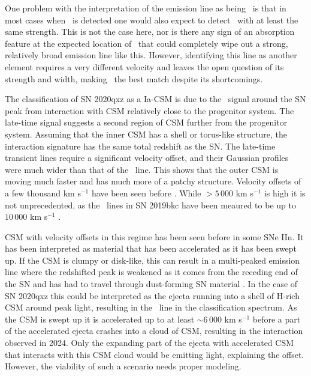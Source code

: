 \documentclass[a4paper,oneside,12pt, class=Latex/Classes/PhDthesisPSnPDF, crop=false]{standalone}
\begin{document}
One problem with the interpretation of the emission line as being \Hbeta\ is that in most cases when \Hbeta\ is detected one would also expect to detect \Halpha\ with at least the same strength. This is not the case here, nor is there any sign of an absorption feature at the expected location of \Halpha\ that could completely wipe out a strong, relatively broad emission line like this. However, identifying this line as another element requires a very different velocity and leaves the open question of its strength and width, making \Hbeta\ the best match despite its shortcomings.

The classification of SN 2020qxz as a Ia-CSM is due to the \Halpha\ signal around the SN peak from interaction with CSM relatively close to the progenitor system. The late-time signal suggests a second region of CSM further from the progenitor system. Assuming that the inner CSM has a shell or torus-like structure, the interaction signature has the same total redshift as the SN. The late-time transient lines require a significant velocity offset, and their Gaussian profiles were much wider than that of the \Halpha\ line. This shows that the outer CSM is moving much faster and has much more of a patchy structure. Velocity offsets of a few thousand km s$^{-1}$ have been seen before \citep{Maeda_exp_asymetry, Maguire_opt_NIR}. While $>5\,000$ km s$^{-1}$ is high it is not unprecedented, as the \CaII\ lines in SN 2019bkc have been meaured to be up to $10\,000$ km s$^{-1}$ \citep{2019bkc_Chen, 2019bkc_Prentice}.

CSM with velocity offsets in this regime has been seen before in some SNe IIn. It has been interpreted as material that has been accelerated as it has been swept up. If the CSM is clumpy or disk-like, this can result in a multi-peaked emission line where the redshifted peak is weakened as it comes from the receding end of the SN and has had to travel through dust-forming SN material \citep{1998S_aspherical_CSM, 1998S_late-time, PTF11iqb}. In the case of SN 2020qxz this could be interpreted as the ejecta running into a shell of H-rich CSM around peak light, resulting in the \Halpha\ line in the classification spectrum. As the CSM is swept up it is accelerated up to at least $\sim6\,000$ km s$^{-1}$ before a part of the accelerated ejecta crashes into a cloud of CSM, resulting in the interaction observed in 2024. Only the expanding part of the ejecta with accelerated CSM that interacts with this CSM cloud would be emitting light, explaining the offset. However, the viability of such a scenario needs proper modeling.
\end{document}
